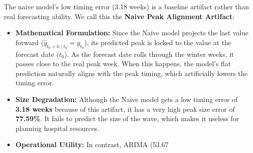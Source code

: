 The naive model's low timing error (3.18 weeks) is a baseline artifact rather than real forecasting ability. We call this the \textbf{Naive Peak Alignment Artifact}:
\begin{itemize}
    \item \textbf{Mathematical Formulation:} Since the Naive model projects the last value forward ($\hat{y}_{t_0+h \mid t_0} = y_{t_0}$), its predicted peak is locked to the value at the forecast date ($t_0$). As the forecast date rolls through the winter weeks, it passes close to the real peak week. When this happens, the model's flat prediction naturally aligns with the peak timing, which artificially lowers the timing error.
    \item \textbf{Size Degradation:} Although the Naive model gets a low timing error of \textbf{3.18 weeks} because of this artifact, it has a very high peak size error of \textbf{77.59\%}. It fails to predict the size of the wave, which makes it useless for planning hospital resources.
    \item \textbf{Operational Utility:} In contrast, ARIMA (53.67%
\end{itemize}
